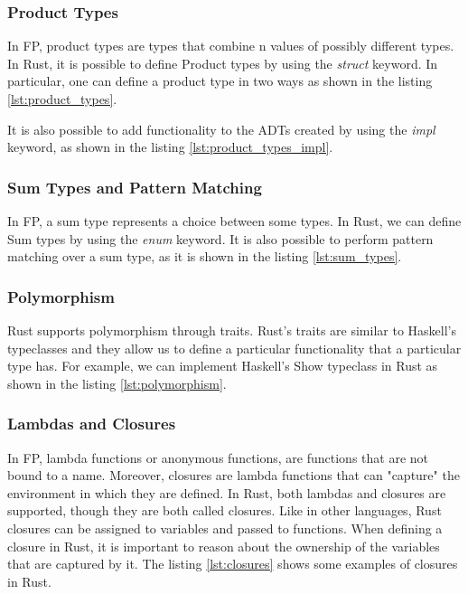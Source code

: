 \subsubsection{Product Types}
In FP, product types are types that combine n values of possibly different types. In Rust, it is possible to define Product types by using the \textit{struct} keyword. In particular, one can define a product type in two ways as shown in the listing \ref{lst:product_types}.



It is also possible to add functionality to the ADTs created by using the \textit{impl} keyword, as shown in the listing \ref{lst:product_types_impl}.



\subsubsection{Sum Types and Pattern Matching}
In FP, a sum type represents a choice between some types. In Rust, we can define Sum types by using the \textit{enum} keyword. It is also possible to perform pattern matching over a sum type, as it is shown in the listing \ref{lst:sum_types}.



\subsubsection{Polymorphism}
Rust supports polymorphism through traits. Rust's traits are similar to Haskell's typeclasses and they allow us to define a particular functionality that a particular type has.
For example, we can implement Haskell's Show typeclass in Rust as shown in the listing \ref{lst:polymorphism}.



\subsubsection{Lambdas and Closures}
In FP, lambda functions or anonymous functions, are functions that are not bound to a name. Moreover, closures are lambda functions that can "capture" the environment in which they are defined.
In Rust, both lambdas and closures are supported, though they are both called closures. Like in other languages, Rust closures can be assigned to variables and passed to functions.
When defining a closure in Rust, it is important to reason about the ownership of the variables that are captured by it. The listing \ref{lst:closures} shows some examples of closures in Rust.

